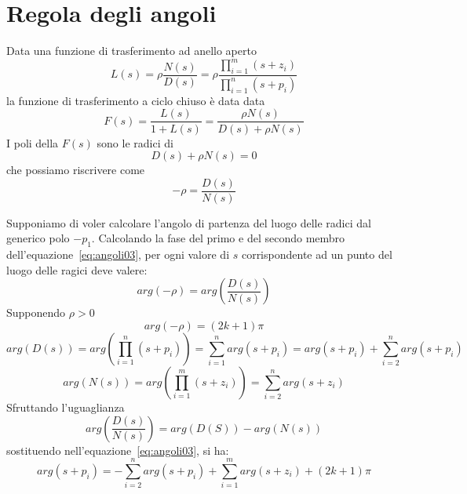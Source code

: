 \documentclass[a4paper]{report}
\begin{document}
\section{Regola degli angoli}
Data una funzione di trasferimento ad anello aperto 
\begin{equation}\label{eq:angoli01}
L(s) = \rho \dfrac{N(s)}{D(s)} = \rho \dfrac{\prod\limits_{i =
    1}^{m} (s + z_i)}{\prod\limits_{i = 1}^{n} (s + p_i)}
\end{equation}
la funzione di trasferimento a ciclo chiuso \`e data data
\begin{equation}\label{eq:angoli02}
F(s) = \dfrac{L(s)}{1 + L(s)} =  \dfrac{\rho N(s)}{D(s) + \rho N(s)}
\end{equation}
I poli della $F(s)$ sono le radici di
\[
D(s) + \rho N(s) = 0
\]
che possiamo riscrivere come
\begin{equation}\label{eq:angoli03}
- \rho = \dfrac{D(s)}{N(s)}
\end{equation}

Supponiamo di voler calcolare l'angolo di partenza del luogo delle
radici dal generico polo $-p_1$. Calcolando la fase del primo e del
secondo membro dell'equazione~\ref{eq:angoli03}, per ogni valore di
$s$ corrispondente ad un punto del luogo delle ragici deve valere:
\begin{equation}\label{eq:angoli04}
arg(- \rho) = arg \left(\dfrac{D(s)}{N(s)} \right)
\end{equation}
Supponendo $\rho > 0$
\[
arg(- \rho) = (2k + 1)\pi
\]
\[
arg(D(s)) = arg\left( \prod\limits_{i = 1}^{n}(s + p_i) \right) =
\sum\limits_{i = 1}^{n} arg(s + p_i) = arg(s + p_i) + \sum\limits_{i =
2}^{n} arg(s + p_i)
\]
\[
arg(N(s)) = arg\left( \prod\limits_{i = 1}^{m}(s + z_i) \right) = \sum\limits_{i =
2}^{n} arg(s + z_i)
\]
Sfruttando l'uguaglianza
\[
arg \left( \dfrac{D(s)}{N(s)}\right) = arg(D(S)) - arg(N(s))
\]
sostituendo nell'equazione~\ref{eq:angoli03}, si ha:
\begin{equation}\label{eq:angoli05}
  arg(s + p_i) = - \sum\limits_{i = 2}^{n} arg(s + p_i) +
  \sum\limits_{i = 1}^{m} arg(s + z_i) + (2k + 1)\pi
\end{equation}
\end{document}
